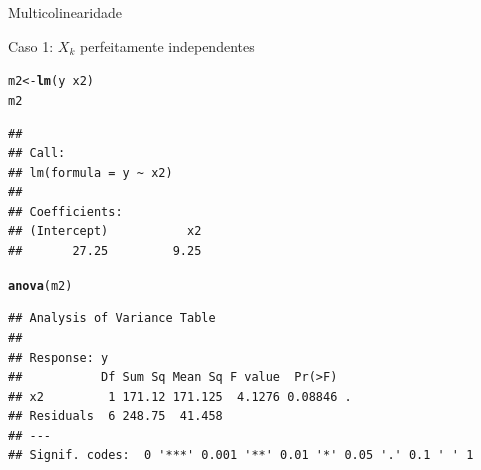 \documentclass{beamer}\usepackage[]{graphicx}\usepackage[]{color}
\makeatletter
\newcommand{\hlopt}[1]{\textcolor[rgb]{0,0,0}{#1}}%
\newcommand{\hlstd}[1]{\textcolor[rgb]{0.345,0.345,0.345}{#1}}%
\newcommand{\hlkwb}[1]{\textcolor[rgb]{0.69,0.353,0.396}{#1}}%
\newcommand{\hlkwd}[1]{\textcolor[rgb]{0.737,0.353,0.396}{\textbf{#1}}}%
\newenvironment{kframe}{%
 \def\at@end@of@kframe{}%
 \ifinner\ifhmode%
  \def\at@end@of@kframe{\end{minipage}}%
  \begin{minipage}{\columnwidth}%
 \fi\fi%
 \def\FrameCommand##1{\hskip\@totalleftmargin \hskip-\fboxsep
 \colorbox{shadecolor}{##1}\hskip-\fboxsep
     \hskip-\linewidth \hskip-\@totalleftmargin \hskip\columnwidth}%
 \MakeFramed {\advance\hsize-\width
   \@totalleftmargin\z@ \linewidth\hsize
   \@setminipage}}%
 {\par\unskip\endMakeFramed%
 \at@end@of@kframe}
\newenvironment{knitrout}{}{} %
\renewenvironment{knitrout}{\setlength{\topsep}{0mm}}{}
\makeatother
\begin{document}
\begin{frame}[fragile]{Multicolinearidade}

Caso 1: $X_k$ perfeitamente independentes
\vfill

\begin{knitrout}\tiny
{}\color{fgcolor}\begin{kframe}
\begin{alltt}
\hlstd{m2} \hlkwb{<-} \hlkwd{lm}\hlstd{(y} \hlopt{~} \hlstd{x2)}
\hlstd{m2}
\end{alltt}
\begin{verbatim}
## 
## Call:
## lm(formula = y ~ x2)
## 
## Coefficients:
## (Intercept)           x2  
##       27.25         9.25
\end{verbatim}
\begin{alltt}
\hlkwd{anova}\hlstd{(m2)}
\end{alltt}
\begin{verbatim}
## Analysis of Variance Table
## 
## Response: y
##           Df Sum Sq Mean Sq F value  Pr(>F)  
## x2         1 171.12 171.125  4.1276 0.08846 .
## Residuals  6 248.75  41.458                  
## ---
## Signif. codes:  0 '***' 0.001 '**' 0.01 '*' 0.05 '.' 0.1 ' ' 1
\end{verbatim}
\end{kframe}
\end{knitrout}

\end{frame}
\end{document}
